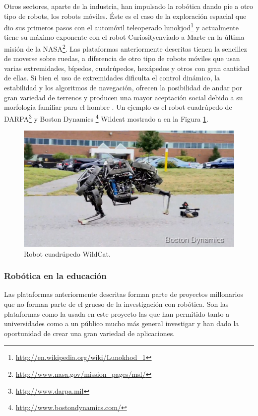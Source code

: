 \documentclass[12pt,a4paper,final,twoside]{article}
\begin{document}
Otros sectores, aparte de la industria, han impulsado la robótica dando pie a otro tipo de robots, los robots móviles. Éste es el caso de la exploración espacial que dio sus primeros pasos con el automóvil teleoperado lunokjod\footnote{\url{http://en.wikipedia.org/wiki/Lunokhod_1}} y actualmente tiene su máximo exponente con el robot Curiosityenviado a Marte en la última misión de la NASA\footnote{\url{http://www.nasa.gov/mission_pages/msl/}}. Las plataformas anteriormente descritas tienen la sencillez de moverse sobre ruedas, a diferencia de otro tipo de robots móviles que usan varias extremidades, bípedos, cuadrúpedos, hexápedos y otros con gran cantidad de ellas. Si bien el uso de extremidades dificulta el control dinámico, la estabilidad y los algoritmos de  navegación, ofrecen la posibilidad de andar por gran variedad de terrenos y producen una mayor aceptación social debido a su morfología familiar para el hombre . Un ejemplo es el robot cuadrúpedo de DARPA\footnote{\url{http://www.darpa.mil}} y Boston Dynamics \footnote{\url{http://www.bostondynamics.com/}} Wildcat mostrado a en la Figura \ref{fig:wildcat}.

\begin{figure}[h!]
	\centering
    \includegraphics[scale=0.6]	{images/Wildcat.jpg}
	 \caption{Robot cuadrúpedo WildCat.}
  \label{fig:wildcat}
\end{figure}

\subsubsection{Robótica en la educación}

Las plataformas anteriormente descritas forman parte de proyectos millonarios que no forman parte de el grueso de la investigación con robótica.
Son las plataformas como la usada en este proyecto las que han permitido tanto a universidades como a un público mucho más general investigar y han dado la oportunidad de crear una gran variedad de aplicaciones.
\end{document}
